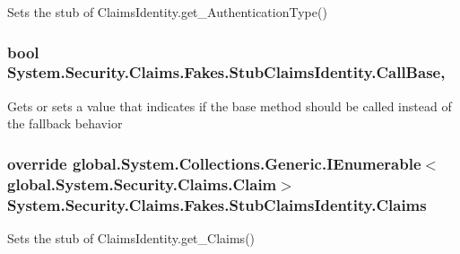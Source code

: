 Sets the stub of Claims\-Identity.\-get\-\_\-\-Authentication\-Type()

\hypertarget{class_system_1_1_security_1_1_claims_1_1_fakes_1_1_stub_claims_identity_ab5ae4c26358e777ac3bc8dca5e78637e}{
\subsubsection[{Call\-Base}]{\setlength{\rightskip}{0pt plus 5cm}bool System.\-Security.\-Claims.\-Fakes.\-Stub\-Claims\-Identity.\-Call\-Base\hspace{0.3cm}{\ttfamily [get]}, {\ttfamily [set]}}}\label{class_system_1_1_security_1_1_claims_1_1_fakes_1_1_stub_claims_identity_ab5ae4c26358e777ac3bc8dca5e78637e}


Gets or sets a value that indicates if the base method should be called instead of the fallback behavior

\hypertarget{class_system_1_1_security_1_1_claims_1_1_fakes_1_1_stub_claims_identity_a5a5f6db27ba5f507a6b0a6346126c738}{
\subsubsection[{Claims}]{\setlength{\rightskip}{0pt plus 5cm}override global.\-System.\-Collections.\-Generic.\-I\-Enumerable$<$global.\-System.\-Security.\-Claims.\-Claim$>$ System.\-Security.\-Claims.\-Fakes.\-Stub\-Claims\-Identity.\-Claims\hspace{0.3cm}{\ttfamily [get]}}}\label{class_system_1_1_security_1_1_claims_1_1_fakes_1_1_stub_claims_identity_a5a5f6db27ba5f507a6b0a6346126c738}


Sets the stub of Claims\-Identity.\-get\-\_\-\-Claims()

